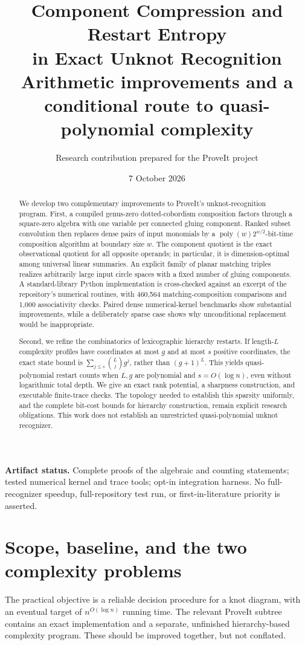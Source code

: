 \documentclass[11pt,letterpaper]{article}
\title{\textbf{Component Compression and Restart Entropy\\in Exact Unknot Recognition}\\[0.6em]
\large Arithmetic improvements and a conditional route to quasi-polynomial complexity}
\author{Research contribution prepared for the ProveIt project}
\date{7 October 2026}
\theoremstyle{definition}
\theoremstyle{remark}
\newcommand{\poly}{\operatorname{poly}}
\begin{document}
\maketitle
\begin{abstract}
We develop two complementary improvements to ProveIt's unknot-recognition
program. First, a compiled genus-zero dotted-cobordism composition factors through
a square-zero algebra with one variable per connected gluing component. Ranked
subset convolution then replaces dense pairs of input monomials by a
$\poly(w)2^{w/2}$-bit-time composition algorithm at boundary size $w$.
The component quotient is the exact observational quotient for all opposite
operands; in particular, it is dimension-optimal among universal linear
summaries. An explicit family of planar matching triples realizes arbitrarily
large input circle spaces with a fixed number of gluing components.
A standard-library Python implementation is cross-checked against an excerpt
of the repository's numerical routines, with 460,564 matching-composition
comparisons and 1,000 associativity checks. Paired dense numerical-kernel
benchmarks show substantial improvements, while a deliberately sparse case
shows why unconditional replacement would be inappropriate.

Second, we refine the combinatorics of lexicographic hierarchy restarts.
If length-$L$ complexity profiles have coordinates at most $g$ and at most
$s$ positive coordinates, the exact state bound is
$\sum_{j\leq s}\binom Lj g^j$, rather than $(g+1)^L$.
This yields quasi-polynomial restart counts when $L,g$ are polynomial and
$s=O(\log n)$, even without logarithmic total depth. We give an exact rank
potential, a sharpness construction, and executable finite-trace checks.
The topology needed to establish this sparsity uniformly, and the complete
bit-cost bounds for hierarchy construction, remain explicit research
obligations. This work does not establish an unrestricted quasi-polynomial
unknot recognizer.
\end{abstract}
\vspace{0.3em}
\noindent\textbf{Artifact status.} Complete proofs of the algebraic and counting
statements; tested numerical kernel and trace tools; opt-in integration harness.
No full-recognizer speedup, full-repository test run, or first-in-literature
priority is asserted.
\newpage
\begingroup
\setlength{\parskip}{0pt}
\small
\tableofcontents
\endgroup
\newpage

\section{Scope, baseline, and the two complexity problems}
\label{sec:scope}
The practical objective is a reliable decision procedure for a knot diagram,
with an eventual target of $n^{O(\log n)}$ running time. The relevant ProveIt
subtree contains an exact implementation and a separate, unfinished
hierarchy-based complexity program. These should be improved together, but
not conflated.
\end{document}
